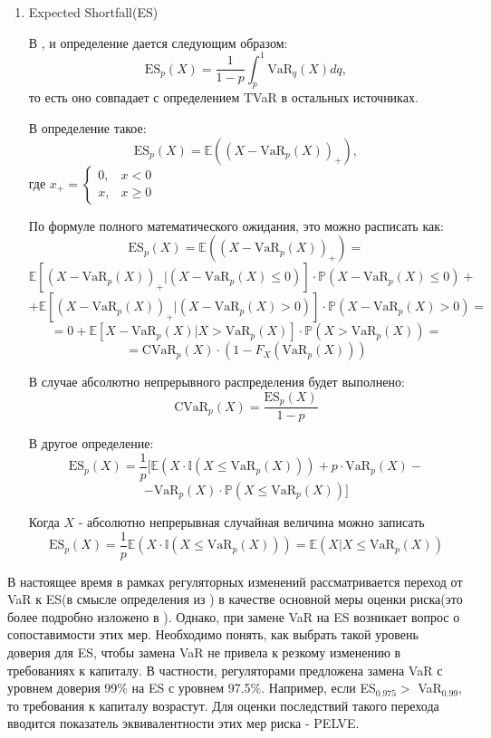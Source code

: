 \documentclass[12pt]{article}
\theoremstyle{plain}
\theoremstyle{definition}
\theoremstyle{remark}
\begin{document}
\begin{enumerate}
    \item Expected Shortfall(ES)
    
    В \cite{McNeil}, \cite{метка0} и \cite{Embrechts} определение дается следующим образом:
    \[
        \text{ES}_p(X)=\frac{1}{1-p}\int_p^1\text{VaR}_q(X)dq,
    \]
    то есть оно совпадает с определением TVaR в остальных источниках.

    В \cite{Denuit} определение такое:
    \[
        \text{ES}_p(X)= \mathbb{E}((X-\text{VaR}_p(X))_{+}),
    \]
    где $x_{+}=
        \begin{cases}
        0, &  x < 0 \\
        x, &  x \geq 0 
        \end{cases}$
    
    По формуле полного математического ожидания, это можно расписать как:
    \[
        \text{ES}_p(X)= \mathbb{E}((X-\text{VaR}_p(X))_{+}) = 
    \]
    \[
        \mathbb{E}[(X-\text{VaR}_p(X))_{+}|(X-\text{VaR}_p(X)\leq 0)]\cdot \mathbb{P}(X-\text{VaR}_p(X)\leq 0) + 
    \]
    \[
         + \mathbb{E}[(X-\text{VaR}_p(X))_{+}|(X-\text{VaR}_p(X) > 0)]\cdot \mathbb{P}(X-\text{VaR}_p(X) > 0) = 
    \]
    \[
        = 0 + \mathbb{E}[X-\text{VaR}_p(X)|X > \text{VaR}_p(X)]\cdot \mathbb{P}(X> \text{VaR}_p(X)) = 
    \]
    \[
        = \text{CVaR}_p(X)\cdot (1-F_X(\text{VaR}_p(X)))
    \]

    В случае абсолютно непрерывного распределения будет выполнено:
    \[
        \text{CVaR}_p(X) = \frac{\text{ES}_p(X)}{1-p}
    \]

    В \cite{Nadarajah} другое определение:
    \[
        \text{ES}_p(X) =  \frac{1}{p}[\mathbb{E}(X\cdot\mathbb{I}(X \leq \text{VaR}_p(X))) + p\cdot\text{VaR}_p(X) - 
    \]
    \[
        - \text{VaR}_p(X)\cdot \mathbb{P}(X \leq \text{VaR}_p(X))]
    \]

    Когда $X$ - абсолютно непрерывная случайная величина можно записать
    \[
        \text{ES}_p(X)= \frac{1}{p}\mathbb{E}(X\cdot\mathbb{I}(X \leq \text{VaR}_p(X))) = \mathbb{E}(X| X \leq \text{VaR}_p(X))
    \]
    
\end{enumerate}


В настоящее время в рамках регуляторных изменений рассматривается переход от VaR к ES(в смысле определения из \cite{McNeil}) в качестве основной меры оценки риска(это более подробно изложено в \cite{BCBS2016}). Однако, при замене VaR на ES возникает вопрос о сопоставимости этих мер. Необходимо понять, как выбрать такой уровень доверия для ES, чтобы замена VaR не привела к резкому изменению в требованиях к капиталу. В частности, регуляторами предложена замена VaR с уровнем доверия 99\% на ES с уровнем 97.5\%. Например, если  ES$_{0.975} >$ VaR$_{0.99}$, то требования к капиталу возрастут. Для оценки последствий такого перехода вводится показатель эквивалентности этих мер риска - PELVE.
\end{document}

